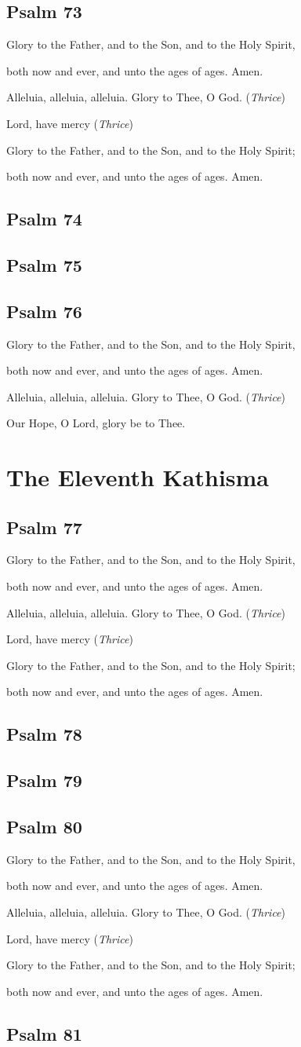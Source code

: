\documentclass[12pt,openany]{book}
\newcommand{\kathismabreak}{
  \medskip
  \begin{center}
  \begin{footnotesize}
  Glory to the Father, and to the Son, and to the Holy Spirit,
  
  both now and ever, and unto the ages of ages. Amen.

  Alleluia, alleluia, alleluia. Glory to Thee, O God. (\textit{Thrice})

  Lord, have mercy (\textit{Thrice})

  Glory to the Father, and to the Son, and to the Holy Spirit;
  
  both now and ever, and unto the ages of ages. Amen.
  \end{footnotesize}
  \end{center}
  \smallbreak
}
\newcommand{\kathismaend}{
  \medskip
  \begin{center}
  \begin{footnotesize}
  Glory to the Father, and to the Son, and to the Holy Spirit,
  
  both now and ever, and unto the ages of ages. Amen.

  Alleluia, alleluia, alleluia. Glory to Thee, O God. (\textit{Thrice})

  Our Hope, O Lord, glory be to Thee.
  \end{footnotesize}
  \end{center}
  \smallbreak
}
\begin{document}
\section{Psalm 73}


\kathismabreak
\smallskip

\section{Psalm 74}

\smallskip
\section{Psalm 75}

\smallskip
\section{Psalm 76}


\kathismaend

\chapter*{The Eleventh Kathisma}
\smallskip
\section{Psalm 77}


\pagebreak %
\kathismabreak
\smallskip

\section{Psalm 78}

\smallskip
\section{Psalm 79}

\bigskip
\section{Psalm 80}


\pagebreak %
\kathismabreak
\smallskip

\section{Psalm 81}

\smallskip
\end{document}
